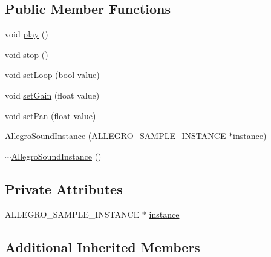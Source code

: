 \subsection*{Public Member Functions}
\begin{DoxyCompactItemize}
\item 
void \hyperlink{classZeta_1_1AllegroSoundInstance_a03445ff331168cd23b5943f324a5c0ce}{play} ()
\item 
void \hyperlink{classZeta_1_1AllegroSoundInstance_a35f836c6af4e94f3796ce2b3b87883b6}{stop} ()
\item 
void \hyperlink{classZeta_1_1AllegroSoundInstance_a8c61431dc1a8435a4c7916b66958f7aa}{set\+Loop} (bool value)
\item 
void \hyperlink{classZeta_1_1AllegroSoundInstance_a6775c3c2771979d75c9feb3f8bdab4c7}{set\+Gain} (float value)
\item 
void \hyperlink{classZeta_1_1AllegroSoundInstance_af1ed68d1916fde033a179da5cf83b9ec}{set\+Pan} (float value)
\item 
\hyperlink{classZeta_1_1AllegroSoundInstance_a05aac96240f7fb1254877f217adc5798}{Allegro\+Sound\+Instance} (A\+L\+L\+E\+G\+R\+O\+\_\+\+S\+A\+M\+P\+L\+E\+\_\+\+I\+N\+S\+T\+A\+N\+C\+E $\ast$\hyperlink{classZeta_1_1AllegroSoundInstance_a92a840b4c42200f0e6706d2b4df308e7}{instance})
\item 
\hyperlink{classZeta_1_1AllegroSoundInstance_a9f31883d1283966d23fbb624e339f1db}{$\sim$\+Allegro\+Sound\+Instance} ()
\end{DoxyCompactItemize}
\subsection*{Private Attributes}
\begin{DoxyCompactItemize}
\item 
A\+L\+L\+E\+G\+R\+O\+\_\+\+S\+A\+M\+P\+L\+E\+\_\+\+I\+N\+S\+T\+A\+N\+C\+E $\ast$ \hyperlink{classZeta_1_1AllegroSoundInstance_a92a840b4c42200f0e6706d2b4df308e7}{instance}
\end{DoxyCompactItemize}
\subsection*{Additional Inherited Members}


